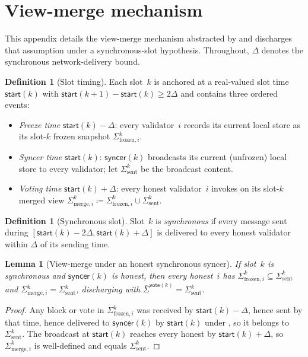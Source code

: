 \documentclass{article}
\newcommand{\syncer}{\mathsf{syncer}}
\newcommand{\start}{\mathsf{start}}
\newcommand{\vote}{\mathsf{vote}}
\newcommand{\comm}[1]{\bar{#1}}
\theoremstyle{plain}
\newtheorem{lemma}{Lemma}
\theoremstyle{definition}
\newtheorem{definition}[theorem]{Definition}
\theoremstyle{remark}
\begin{document}
\appendix

\section{View-merge mechanism}\label{app:view-merge}

This appendix details the view-merge mechanism abstracted by  and discharges that assumption under a synchronous-slot hypothesis.
Throughout, $\Delta$ denotes the synchronous network-delivery bound.

\begin{definition}[Slot timing]\label{rev:def:slot-timing}
Each slot~$k$ is anchored at a real-valued slot time $\start(k)$ with $\start(k+1) - \start(k) \geq 2\Delta$ and contains three ordered events:
\begin{itemize}
  \item \emph{Freeze time} $\start(k) - \Delta$: every validator~$i$ records its current local store as its slot-$k$ frozen snapshot $\Sigma^k_{\mathrm{frozen},i}$.
  \item \emph{Syncer time} $\start(k)$: $\syncer(k)$ broadcasts its current (unfrozen) local store to every validator; let $\Sigma^k_{\mathrm{sent}}$ be the broadcast content.
  \item \emph{Voting time} $\start(k) + \Delta$: every honest validator~$i$ invokes  on its slot-$k$ merged view $\Sigma^k_{\mathrm{merge},i} \coloneqq \Sigma^k_{\mathrm{frozen},i} \cup \Sigma^k_{\mathrm{sent}}$.
\end{itemize}
\end{definition}

\begin{definition}[Synchronous slot]\label{rev:def:synchrony-window}
Slot~$k$ is \emph{synchronous} if every message sent during $[\start(k) - 2\Delta, \start(k) + \Delta]$ is delivered to every honest validator within $\Delta$ of its sending time.
\end{definition}

\begin{lemma}[View-merge under an honest synchronous syncer]\label{rev:lem:view-merge}
If slot~$k$ is synchronous and $\syncer(k)$ is honest, then every honest~$i$ has $\Sigma^k_{\mathrm{frozen},i} \subseteq \Sigma^k_{\mathrm{sent}}$ and $\Sigma^k_{\mathrm{merge},i} = \Sigma^k_{\mathrm{sent}}$, discharging  with $\comm{\Sigma}^{\vote(k)} = \Sigma^k_{\mathrm{sent}}$.
\end{lemma}

\begin{proof}
Any block or vote in $\Sigma^k_{\mathrm{frozen},i}$ was received by $\start(k) - \Delta$, hence sent by that time, hence delivered to $\syncer(k)$ by $\start(k)$ under , so it belongs to $\Sigma^k_{\mathrm{sent}}$.
The broadcast at $\start(k)$ reaches every honest by $\start(k) + \Delta$, so $\Sigma^k_{\mathrm{merge},i}$ is well-defined and equals $\Sigma^k_{\mathrm{sent}}$.
\end{proof}
\end{document}

